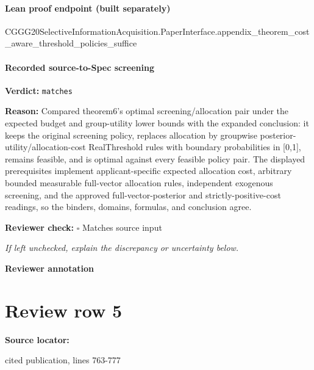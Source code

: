 \documentclass[10pt]{article}
\newcommand{\reviewerbox}{%
  \par\noindent\fbox{\parbox{0.96\linewidth}{\rule{0pt}{0.38in}}}\par
}
\newcommand{\reviewmatch}[1]{%
  \par\noindent\textbf{Reviewer check:} $\square$\; #1\par
  \noindent\emph{If left unchecked, explain the discrepancy or uncertainty below.}\par
}
\begin{document}
\paragraph{Lean proof endpoint (built separately)}\begin{ReviewVerbatim}
CGGG20SelectiveInformationAcquisition.PaperInterface.appendix_theorem_cost_aware_threshold_policies_suffice
\end{ReviewVerbatim}

\paragraph{Recorded source-to-Spec screening}
\textbf{Verdict:} \texttt{matches}
\\
{\raggedright
\textbf{Reason:} Compared theorem6's optimal screening/\allowbreak{}allocation pair under the expected budget and group-\allowbreak{}utility lower bounds with the expanded conclusion:\allowbreak{} it keeps the original screening policy, replaces allocation by groupwise posterior-\allowbreak{}utility/\allowbreak{}allocation-\allowbreak{}cost RealThreshold rules with boundary probabilities in [0,1], remains feasible, and is optimal against every feasible policy pair.\allowbreak{} The displayed prerequisites implement applicant-\allowbreak{}specific expected allocation cost, arbitrary bounded measurable full-\allowbreak{}vector allocation rules, independent exogenous screening, and the approved full-\allowbreak{}vector-\allowbreak{}posterior and strictly-\allowbreak{}positive-\allowbreak{}cost readings, so the binders, domains, formulas, and conclusion agree.\allowbreak{}
\par}
\reviewmatch{Matches source input}
\noindent\textbf{Reviewer annotation}\par
\reviewerbox
\clearpage
\hypertarget{source-claim-d6321425932c863a}{}
\section*{Review row 5}
\textbf{Source locator:} {\footnotesize\raggedright cited publication, lines 763-\allowbreak{}777\par}
\end{document}

